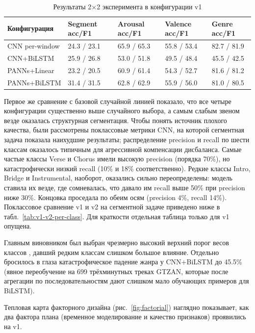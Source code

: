 \begin{table}[H]
\centering
\caption{Результаты 2$\times$2 эксперимента в конфигурации v1}
\label{tab:v1-results}
\begin{tabular}{L{3.5cm}L{2.6cm}L{2.6cm}L{2.6cm}L{2.6cm}}
\toprule
Конфигурация & Segment acc/F1 & Arousal acc/F1 & Valence acc/F1 & Genre acc/F1 \\
\midrule
CNN per-window & 24.3 / 23.1 & 65.9 / 65.3 & 55.8 / 53.4 & 82.7 / 81.9 \\
CNN+BiLSTM & 25.9 / 26.8 & 53.0 / 51.8 & 49.5 / 48.4 & 45.5 / 42.5 \\
PANNs+Linear & 23.2 / 20.5 & 60.9 / 61.4 & 54.3 / 52.7 & 81.6 / 81.2 \\
PANNs+BiLSTM & 31.4 / 31.5 & 62.8 / 62.9 & 55.9 / 56.0 & 81.0 / 80.5 \\
\bottomrule
\end{tabular}
\end{table}

Первое же сравнение с базовой случайной линией показало, что все четыре конфигурации существенно выше случайного выбора, а самым слабым звеном везде оказалась структурная сегментация. Чтобы понять источник плохого качества, были рассмотрены поклассовые метрики CNN, на которой сегментная задача показала наихудшие результаты; распределение precision и recall по шести классам оказалось типичным для агрессивной компенсации дисбаланса. Самые частые классы Verse и Chorus имели высокую precision (порядка 70\%), но катастрофически низкий recall (10\% и 18\% соответственно). Редкие классы Intro, Bridge и Instrumental, наоборот, оказались сильно переопределены: модель ставила их везде, где сомневалась, что давало им recall выше 50\% при precision ниже 30\%. Концовка проседала по обеим осям (precision 4\%, recall 14\%). Поклассовое сравнение v1 и v2 на сегментной задаче приведено ниже в табл.~\ref{tab:v1-v2-per-class}. Для краткости отдельная таблица только для v1 опущена.

Главным виновником был выбран чрезмерно высокий верхний порог весов классов , давший редким классам слишком большое влияние. Отдельно бросилось в глаза катастрофическое падение жанра у CNN+BiLSTM до 45.5\% (явное переобучение на 699 трёхминутных треках GTZAN, которые после агрегации по последовательностям дают слишком мало обучающих примеров для BiLSTM).

Тепловая карта факторного дизайна (рис.~\ref{fig:factorial}) наглядно показывает, как два фактора плана (временное моделирование и качество признаков) проявились на v1.

